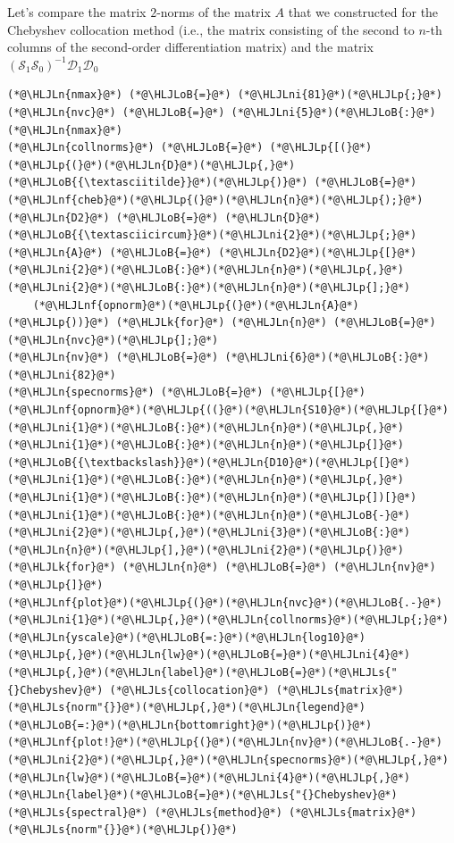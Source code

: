 \documentclass[12pt,a4paper]{article}
\newcommand{\HLJLk}[1]{\textcolor[RGB]{148,91,176}{\textbf{#1}}}
\newcommand{\HLJLn}[1]{#1}
\newcommand{\HLJLnf}[1]{\textcolor[RGB]{66,102,213}{#1}}
\newcommand{\HLJLs}[1]{\textcolor[RGB]{201,61,57}{#1}}
\newcommand{\HLJLni}[1]{\textcolor[RGB]{59,151,46}{#1}}
\newcommand{\HLJLoB}[1]{\textcolor[RGB]{102,102,102}{\textbf{#1}}}
\newcommand{\HLJLp}[1]{#1}
\begin{document}
Let's compare the matrix $2$-norms of the matrix $A$ that we constructed for the Chebyshev collocation method (i.e., the matrix consisting of the second to $n$-th columns of the second-order differentiation matrix) and the matrix $(\mathcal{S}_1\mathcal{S}_0)^{-1}\mathcal{D}_1\mathcal{D}_0$


\begin{lstlisting}
(*@\HLJLn{nmax}@*) (*@\HLJLoB{=}@*) (*@\HLJLni{81}@*)(*@\HLJLp{;}@*) (*@\HLJLn{nvc}@*) (*@\HLJLoB{=}@*) (*@\HLJLni{5}@*)(*@\HLJLoB{:}@*)(*@\HLJLn{nmax}@*)
(*@\HLJLn{collnorms}@*) (*@\HLJLoB{=}@*) (*@\HLJLp{[(}@*) (*@\HLJLp{(}@*)(*@\HLJLn{D}@*)(*@\HLJLp{,}@*)(*@\HLJLoB{{\textasciitilde}}@*)(*@\HLJLp{)}@*) (*@\HLJLoB{=}@*) (*@\HLJLnf{cheb}@*)(*@\HLJLp{(}@*)(*@\HLJLn{n}@*)(*@\HLJLp{);}@*) (*@\HLJLn{D2}@*) (*@\HLJLoB{=}@*) (*@\HLJLn{D}@*)(*@\HLJLoB{{\textasciicircum}}@*)(*@\HLJLni{2}@*)(*@\HLJLp{;}@*) (*@\HLJLn{A}@*) (*@\HLJLoB{=}@*) (*@\HLJLn{D2}@*)(*@\HLJLp{[}@*)(*@\HLJLni{2}@*)(*@\HLJLoB{:}@*)(*@\HLJLn{n}@*)(*@\HLJLp{,}@*)(*@\HLJLni{2}@*)(*@\HLJLoB{:}@*)(*@\HLJLn{n}@*)(*@\HLJLp{];}@*)
    (*@\HLJLnf{opnorm}@*)(*@\HLJLp{(}@*)(*@\HLJLn{A}@*)(*@\HLJLp{))}@*) (*@\HLJLk{for}@*) (*@\HLJLn{n}@*) (*@\HLJLoB{=}@*) (*@\HLJLn{nvc}@*)(*@\HLJLp{];}@*)
(*@\HLJLn{nv}@*) (*@\HLJLoB{=}@*) (*@\HLJLni{6}@*)(*@\HLJLoB{:}@*)(*@\HLJLni{82}@*) 
(*@\HLJLn{specnorms}@*) (*@\HLJLoB{=}@*) (*@\HLJLp{[}@*)(*@\HLJLnf{opnorm}@*)(*@\HLJLp{((}@*)(*@\HLJLn{S10}@*)(*@\HLJLp{[}@*)(*@\HLJLni{1}@*)(*@\HLJLoB{:}@*)(*@\HLJLn{n}@*)(*@\HLJLp{,}@*)(*@\HLJLni{1}@*)(*@\HLJLoB{:}@*)(*@\HLJLn{n}@*)(*@\HLJLp{]}@*)(*@\HLJLoB{{\textbackslash}}@*)(*@\HLJLn{D10}@*)(*@\HLJLp{[}@*)(*@\HLJLni{1}@*)(*@\HLJLoB{:}@*)(*@\HLJLn{n}@*)(*@\HLJLp{,}@*)(*@\HLJLni{1}@*)(*@\HLJLoB{:}@*)(*@\HLJLn{n}@*)(*@\HLJLp{])[}@*)(*@\HLJLni{1}@*)(*@\HLJLoB{:}@*)(*@\HLJLn{n}@*)(*@\HLJLoB{-}@*)(*@\HLJLni{2}@*)(*@\HLJLp{,}@*)(*@\HLJLni{3}@*)(*@\HLJLoB{:}@*)(*@\HLJLn{n}@*)(*@\HLJLp{],}@*)(*@\HLJLni{2}@*)(*@\HLJLp{)}@*) (*@\HLJLk{for}@*) (*@\HLJLn{n}@*) (*@\HLJLoB{=}@*) (*@\HLJLn{nv}@*)(*@\HLJLp{]}@*)
(*@\HLJLnf{plot}@*)(*@\HLJLp{(}@*)(*@\HLJLn{nvc}@*)(*@\HLJLoB{.-}@*)(*@\HLJLni{1}@*)(*@\HLJLp{,}@*)(*@\HLJLn{collnorms}@*)(*@\HLJLp{;}@*)(*@\HLJLn{yscale}@*)(*@\HLJLoB{=:}@*)(*@\HLJLn{log10}@*)(*@\HLJLp{,}@*)(*@\HLJLn{lw}@*)(*@\HLJLoB{=}@*)(*@\HLJLni{4}@*)(*@\HLJLp{,}@*)(*@\HLJLn{label}@*)(*@\HLJLoB{=}@*)(*@\HLJLs{"{}Chebyshev}@*) (*@\HLJLs{collocation}@*) (*@\HLJLs{matrix}@*) (*@\HLJLs{norm"{}}@*)(*@\HLJLp{,}@*)(*@\HLJLn{legend}@*)(*@\HLJLoB{=:}@*)(*@\HLJLn{bottomright}@*)(*@\HLJLp{)}@*)
(*@\HLJLnf{plot!}@*)(*@\HLJLp{(}@*)(*@\HLJLn{nv}@*)(*@\HLJLoB{.-}@*)(*@\HLJLni{2}@*)(*@\HLJLp{,}@*)(*@\HLJLn{specnorms}@*)(*@\HLJLp{,}@*)(*@\HLJLn{lw}@*)(*@\HLJLoB{=}@*)(*@\HLJLni{4}@*)(*@\HLJLp{,}@*)(*@\HLJLn{label}@*)(*@\HLJLoB{=}@*)(*@\HLJLs{"{}Chebyshev}@*) (*@\HLJLs{spectral}@*) (*@\HLJLs{method}@*) (*@\HLJLs{matrix}@*) (*@\HLJLs{norm"{}}@*)(*@\HLJLp{)}@*)

\end{lstlisting}
\end{document}
